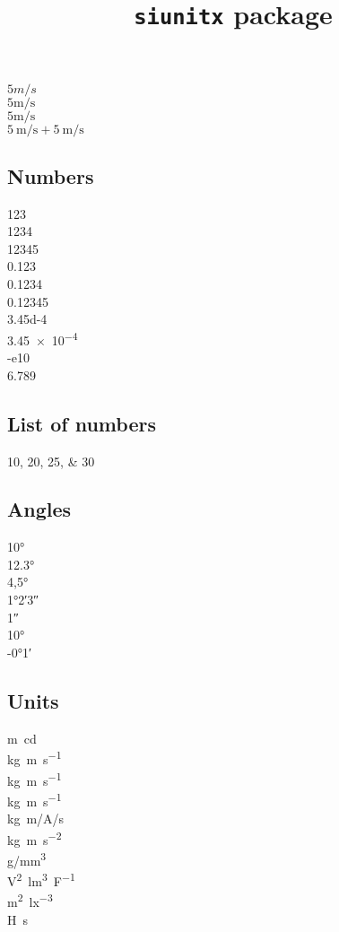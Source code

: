 \documentclass[12pt]{article}
\begin{document}
\title{\texttt{siunitx} package}
\maketitle

$5 m/s$ \\
$5 \mathrm{m}/\mathrm{s}$ \\
$5 \unit{\m\per\s}$ \\
$\qty{5}{\m\per\s} + \qty{5}{\m\per\s}$

\subsection*{Numbers}
\num{123} \\
\num{1234} \\
\num{12345} \\
\num{0.123} \\
\num{0,1234} \\
\num{.12345} \\
\num{3.45d-4} \\
\num{3.45e-4} \\
\num{-e10} \\
\num[locale = DE]{6.789}

\subsection*{List of numbers}
\numlist{10;20;25;30}

\subsection*{Angles}
\ang{10} \\
\ang{12.3} \\
\ang{4,5} \\
\ang{1;2;3} \\
\ang{;;1} \\
\ang{+10;;} \\
\ang{-0;1;}

\subsection*{Units}
\unit{\m\candela} \\
\unit{kg.m.s^{-1}} \\
\unit{\kilogram\metre\per\second} \\
\unit{\kg\m\per\s} \\
\unit[per-mode = symbol]{\kilogram\metre\per\ampere\per\second}\\
\unit{\kilo\gram\metre\per\square\second} \\
\unit[per-mode = symbol]{\gram\per\cubic\milli\metre} \\
\unit{\square\volt\cubic\lumen\per\farad} \\
\unit{\metre\squared\per\cubic\lux} \\
\unit{\henry\second}
\end{document}
